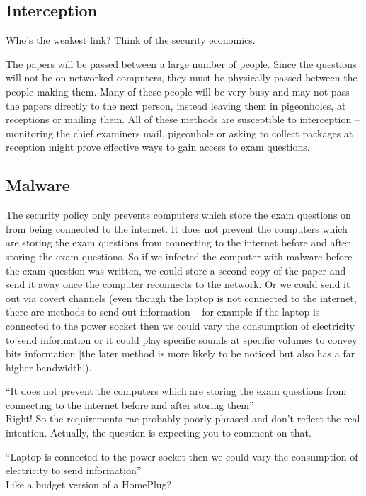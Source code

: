\documentclass[10pt,\jkfside,a4paper]{article}
\begin{document}
\begin{enumerate}
\begin{enumerate}
\begin{enumerate}[label=(\roman*)]
\subsection*{Interception}

{\color{blue}
Who's the weakest link? Think of the security economics.
}

The papers will be passed between a large number of people. Since the questions will
not be on networked computers, they must be physically passed between the people
making them. Many of these people will be very busy and may not pass the papers directly to
the next person, instead leaving them in pigeonholes, at receptions or mailing them.
All of these methods are susceptible to interception -- monitoring the chief examiners
mail, pigeonhole or asking to collect packages at reception might prove
effective ways to gain access to exam questions.

\subsection*{Malware}

The security policy only prevents computers which store the exam questions on
from being connected to the internet. It does not prevent the computers which are
storing the exam questions from connecting to the internet before and after storing
the exam questions. So if we infected the computer with malware before the exam question
was written, we could store a second copy of the paper and send it away once the computer
reconnects to the network. Or we could send it out via covert channels (even though the laptop
is not connected to the internet, there are methods to send out information -- for example
if the laptop is connected to the power socket then we could vary the consumption of
electricity to send information or it could play specific sounds at specific volumes to
convey bits information [the later method is more likely to be noticed but also has a
far higher bandwidth]).

{\color{blue}
``It does not prevent the computers which are storing the exam questions from connecting to the
internet before and after storing them''\\
Right! So the requirements rae probably poorly phrased and don't reflect the real intention.
Actually, the question is expecting you to comment on that.
}

{\color{blue}
``Laptop is connected to the power socket then we could vary the consumption of electricity to send information''\\
Like a budget version of a HomePlug?
}


\end{enumerate}
\end{enumerate}
\end{enumerate}
\end{document}
